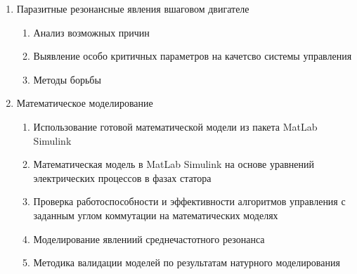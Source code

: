 \begin{enumerate}
    \item{Паразитные резонансные явления вшаговом двигателе}
        \begin{enumerate}
            \item Анализ возможных причин
            \item Выявление особо критичных параметров на качетсво системы управления
            \item Методы борьбы
        \end{enumerate}

    \item{Математическое моделирование}
        \begin{enumerate}
            \item Использование готовой математической модели из пакета MatLab Simulink
            \item Математическая модель в MatLab Simulink на основе уравнений электрических
                    процессов в фазах статора
            \item Проверка работоспособности и эффективности алгоритмов управления с заданным углом
                    коммутации на математических моделях
            \item Моделирование явлениий среднечастотного резонанса
            \item Методика валидации моделей по результатам натурного моделирования
        \end{enumerate}
\end{enumerate}

\newpage
